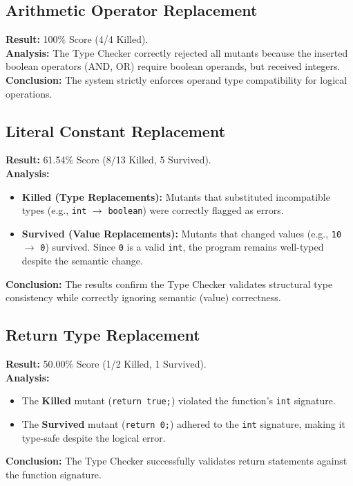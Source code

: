 \documentclass[titlepage]{article}
\begin{document}
\subsection{Arithmetic Operator Replacement}

\textbf{Result:} 100\% Score (4/4 Killed). \\
\textbf{Analysis:} The Type Checker correctly rejected all mutants because the inserted boolean operators (AND, OR) require boolean operands, but received integers. \\
\textbf{Conclusion:} The system strictly enforces operand type compatibility for logical operations.

\subsection{Literal Constant Replacement}

\textbf{Result:} 61.54\% Score (8/13 Killed, 5 Survived). \\
\textbf{Analysis:}
\begin{itemize}[nosep]
    \item \textbf{Killed (Type Replacements):} Mutants that substituted incompatible types (e.g., \texttt{int} $\to$ \texttt{boolean}) were correctly flagged as errors.
    \item \textbf{Survived (Value Replacements):} Mutants that changed values (e.g., \texttt{10} $\to$ \texttt{0}) survived. Since \texttt{0} is a valid \texttt{int}, the program remains well-typed despite the semantic change.
\end{itemize}
\textbf{Conclusion:} The results confirm the Type Checker validates structural type consistency while correctly ignoring semantic (value) correctness.

\subsection{Return Type Replacement}

\textbf{Result:} 50.00\% Score (1/2 Killed, 1 Survived). \\
\textbf{Analysis:}
\begin{itemize}[nosep]
    \item The \textbf{Killed} mutant (\texttt{return true;}) violated the function's \texttt{int} signature.
    \item The \textbf{Survived} mutant (\texttt{return 0;}) adhered to the \texttt{int} signature, making it type-safe despite the logical error.
\end{itemize}
\textbf{Conclusion:} The Type Checker successfully validates return statements against the function signature.
\end{document}
